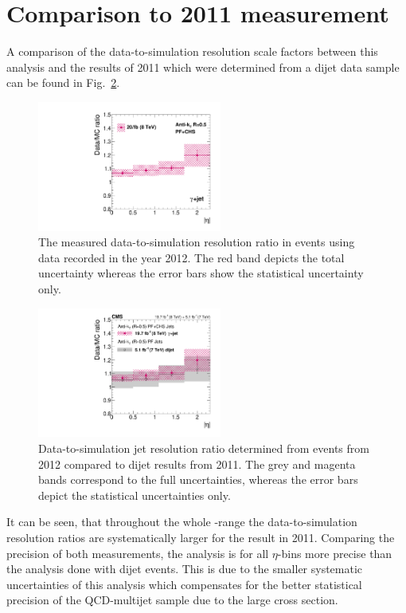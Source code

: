\section{Comparison to 2011 measurement}
\label{res:sec:comparison_2010}
A comparison of the data-to-simulation resolution scale factors \rhores between this analysis and the results of 2011 which were determined from a dijet data sample~\cite{bib:Matthias_Thesis} can be found in Fig.~\ref{res:fig:Comparison_2011}.
\begin{figure}[!t]
 \centering
    \includegraphics[width=0.54\textwidth]{figures/resolution/results/MySingleFinalResult.pdf}
  \caption{The measured data-to-simulation resolution ratio in \GAMJET events using data recorded in the year 2012.
           The red band depicts the total uncertainty whereas the error bars show the statistical uncertainty only.}
  \label{res:fig:RatioFinal}
\end{figure}
\begin{figure}[!t]
 \centering
 \includegraphics[width=0.54\textwidth]{figures/resolution/results/Figure_43_left_Teresa_cmsStyle_updated_5.pdf}
 \caption{Data-to-simulation jet \pt resolution ratio determined from \GAMJET events from 2012 compared to dijet results from 2011.
             The grey and magenta bands correspond to the full uncertainties, whereas the error bars depict the statistical uncertainties only.}
 \label{res:fig:Comparison_2011}
\end{figure}
It can be seen, that throughout the whole \etajet-range the data-to-simulation resolution ratios \rhores are systematically larger for the result in 2011. 
Comparing the precision of both measurements, the \GAMJET analysis is for all $\eta$-bins more precise than the analysis done with dijet events.
This is due to the smaller systematic uncertainties of this analysis which compensates for the better statistical precision of the QCD-multijet sample due to the large cross section.


